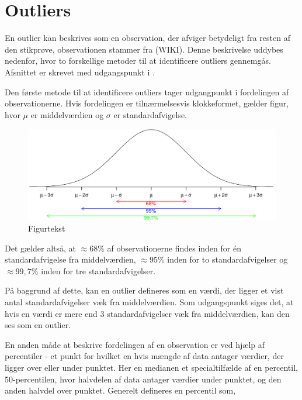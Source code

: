 \documentclass[
]{book}
\theoremstyle{definition}
\theoremstyle{definition}
\theoremstyle{definition}
\theoremstyle{remark}
\begin{document}
\hypertarget{outliers}{%
\section{Outliers}\label{outliers}}

En outlier kan beskrives som en observation, der afviger betydeligt fra resten af den stikprøve, observationen stammer fra (WIKI). Denne beskrivelse uddybes nedenfor, hvor to forskellige metoder til at identificere outliers gennemgås. Afsnittet er skrevet med udgangspunkt i \citep[s. 48-55]{ASTA}.

Den første metode til at identificere outliers tager udgangpunkt i fordelingen af observationerne. Hvis fordelingen er tilnærmelsesvis klokkeformet, gælder figur, hvor \(\mu\) er middelværdien og \(\sigma\) er standardafvigelse.

\begin{figure}

{\centering \includegraphics[width=0.75\linewidth]{images/Normalfordeling} 

}

\caption{Figurtekst}\label{fig:unnamed-chunk-2}
\end{figure}

Det gælder altså, at \(\approx 68 \%\) af observationerne findes inden for én standardafvigelse fra middelværdien, \(\approx 95 \%\) inden for to standardafvigelser og \(\approx 99,7 \%\) inden for tre standardafvigelser.

På baggrund af dette, kan en outlier defineres som en værdi, der ligger et vist antal standardafvigelser væk fra middelværdien. Som udgangspunkt siges det, at hvis en værdi er mere end \(3\) standardafvigelser væk fra middelværdien, kan den ses som en outlier.

En anden måde at beskrive fordelingen af en observation er ved hjælp af percentiler - et punkt for hvilket en hvis mængde af data antager værdier, der ligger over eller under punktet. Her en medianen et specialtilfælde af en percentil, 50-percentilen, hvor halvdelen af data antager værdier under punktet, og den anden halvdel over punktet. Generelt defineres en percentil som,
\end{document}
